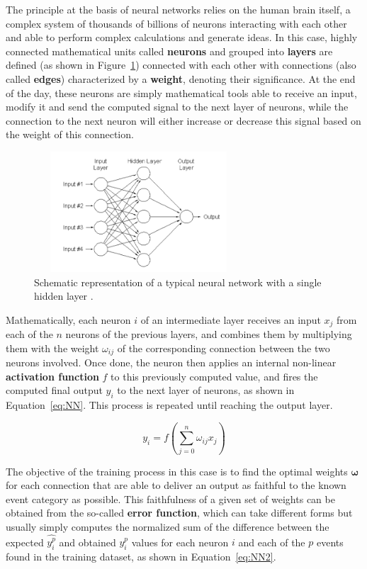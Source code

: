 \documentclass[a4paper, 10pt, openright]{report}
\begin{document}
The principle at the basis of neural networks relies on the human brain itself, a complex system of thousands of billions of neurons interacting with each other and able to perform complex calculations and generate ideas. In this case, highly connected mathematical units called \textbf{neurons} and grouped into \textbf{layers} are defined (as shown in Figure~\ref{fig:NN}) connected with each other with connections (also called \textbf{edges}) characterized by a \textbf{weight}, denoting their significance. At the end of the day, these neurons are simply mathematical tools able to receive an input, modify it and send the computed signal to the next layer of neurons, while the connection to the next neuron will either increase or decrease this signal based on the weight of this connection.

\begin{figure}[htbp]
\centering
\includegraphics[width=7.8cm, height=4.5cm]{figs/NN.png}
\caption{Schematic representation of a typical neural network with a single hidden layer \cite{NN}.}
\label{fig:NN}
\end{figure}

Mathematically, each neuron $i$ of an intermediate layer receives an input $x_{j}$ from each of the $n$ neurons of the previous layers, and combines them by multiplying them with the weight $\omega_{ij}$ of the corresponding connection between the two neurons involved. Once done, the neuron then applies an internal non-linear \textbf{activation function} $f$ to this previously computed value, and fires the computed final output $y_i$ to the next layer of neurons, as shown in Equation~\ref{eq:NN}. This process is repeated until reaching the output layer.

\begin{equation}
\label{eq:NN}
y_i = f \left (\sum_{j = 0}^n \omega_{ij} x_j \right)
\end{equation}

The objective of the training process in this case is to find the optimal weights $\bm \omega$ for each connection that are able to deliver an output as faithful to the known event category as possible. This faithfulness of a given set of weights can be obtained from the so-called \textbf{error function}, which can take different forms but usually simply computes the normalized sum of the difference between the expected $\hat{y_i^p}$ and obtained $y_i^p$ values for each neuron $i$ and each of the $p$ events found in the training dataset, as shown in Equation~\ref{eq:NN2}.
\end{document}
